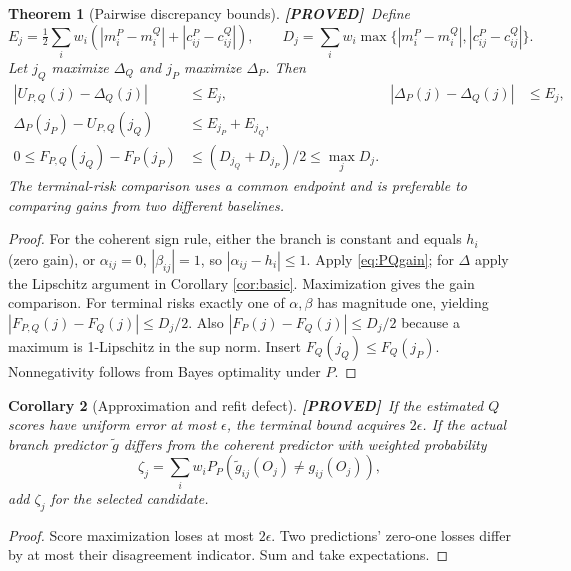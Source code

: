 \documentclass[11pt]{article}
\newtheorem{theorem}{Theorem}[section]
\newtheorem{corollary}[theorem]{Corollary}
\theoremstyle{definition}
\newcommand{\1}{\mathbf 1}
\newcommand{\pr}{\textbf{[PROVED]}}
\begin{document}
\begin{theorem}[Pairwise discrepancy bounds]\label{th:regret}
\pr\ Define
\[
 E_j=\tfrac12\sum_iw_i(|m_i^P-m_i^Q|+|c_{ij}^P-c_{ij}^Q|),\qquad
 D_j=\sum_iw_i\max\{|m_i^P-m_i^Q|,|c_{ij}^P-c_{ij}^Q|\}.
\]
Let $j_Q$ maximize $\Delta_Q$ and $j_P$ maximize $\Delta_P$.
Then
\begin{align*}
 |U_{P,Q}(j)-\Delta_Q(j)|&\le E_j,&
 |\Delta_P(j)-\Delta_Q(j)|&\le E_j,\\
 \Delta_P(j_P)-U_{P,Q}(j_Q)&\le E_{j_P}+E_{j_Q},\\
 0\le F_{P,Q}(j_Q)-F_P(j_P)&\le(D_{j_Q}+D_{j_P})/2\le\max_jD_j.
\end{align*}
The terminal-risk comparison uses a common endpoint and is preferable to
comparing gains from two different baselines.
\end{theorem}
\begin{proof}
For the coherent sign rule, either the branch is constant and equals $h_i$
(zero gain), or $\alpha_{ij}=0$, $|\beta_{ij}|=1$, so
$|\alpha_{ij}-h_i|\le1$. Apply \eqref{eq:PQgain}; for $\Delta$ apply the
Lipschitz argument in Corollary \ref{cor:basic}. Maximization gives the gain
comparison. For terminal risks exactly one of $\alpha,\beta$ has magnitude
one, yielding $|F_{P,Q}(j)-F_Q(j)|\le D_j/2$.
Also $|F_P(j)-F_Q(j)|\le D_j/2$ because a maximum is 1-Lipschitz in the
sup norm. Insert $F_Q(j_Q)\le F_Q(j_P)$.
Nonnegativity follows from Bayes optimality under $P$.
\end{proof}
\begin{corollary}[Approximation and refit defect]
\pr\ If the estimated $Q$ scores have uniform error at most $\epsilon$,
the terminal bound acquires $2\epsilon$. If the actual branch predictor
$\widetilde g$ differs from the coherent predictor with weighted probability
\[
 \zeta_j=\sum_iw_i P_P(\widetilde g_{ij}(O_j)\ne g_{ij}(O_j)),
\]
add $\zeta_j$ for the selected candidate.
\end{corollary}
\begin{proof}
Score maximization loses at most $2\epsilon$.
Two predictions' zero-one losses differ by at most their disagreement
indicator. Sum and take expectations.
\end{proof}
\end{document}

